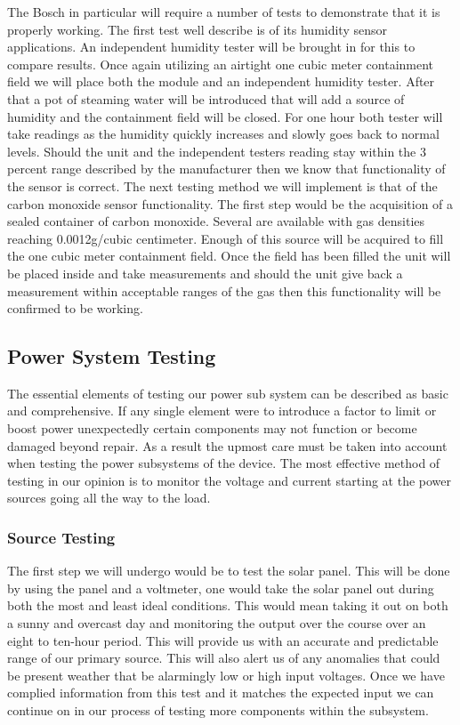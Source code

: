 The Bosch in particular will require a number of tests to demonstrate that it is properly working. The first test well describe is of its humidity sensor applications. An independent humidity tester will be brought in for this to compare results. Once again utilizing an airtight one cubic meter containment field we will place both the module and an independent humidity tester. After that a pot of steaming water will be introduced that will add a source of humidity and the containment field will be closed. For one hour both tester will take readings as the humidity quickly increases and slowly goes back to normal levels. Should the unit and the independent testers reading stay within the 3 percent range described by the manufacturer then we know that functionality of the sensor is correct.
The next testing method we will implement is that of the carbon monoxide sensor functionality. The first step would be the acquisition of a sealed container of carbon monoxide. Several are available with gas densities reaching 0.0012g/cubic centimeter. Enough of this source will be acquired to fill the one cubic meter containment field. Once the field has been filled the unit will be placed inside and take measurements and should the unit give back a measurement within acceptable ranges of the gas then this functionality will be confirmed to be working.

\subsection{Power System Testing}
The essential elements of testing our power sub system can be described as basic and comprehensive. If any single element were to introduce a factor to limit or boost power unexpectedly certain components may not function or become damaged beyond repair. As a result the upmost care must be taken into account when testing the power subsystems of the device. The most effective method of testing in our opinion is to monitor the voltage and current starting at the power sources going all the way to the load. 

\subsubsection{Source Testing}
The first step we will undergo would be to test the solar panel. This will be done by using the panel and a voltmeter, one would take the solar panel out during both the most and least ideal conditions. This would mean taking it out on both a sunny and overcast day and monitoring the output over the course over an eight to ten-hour period. This will provide us with an accurate and predictable range of our primary source. This will also alert us of any anomalies that could be present weather that be alarmingly low or high input voltages. Once we have complied information from this test and it matches the expected input we can continue on in our process of testing more components within the subsystem.

